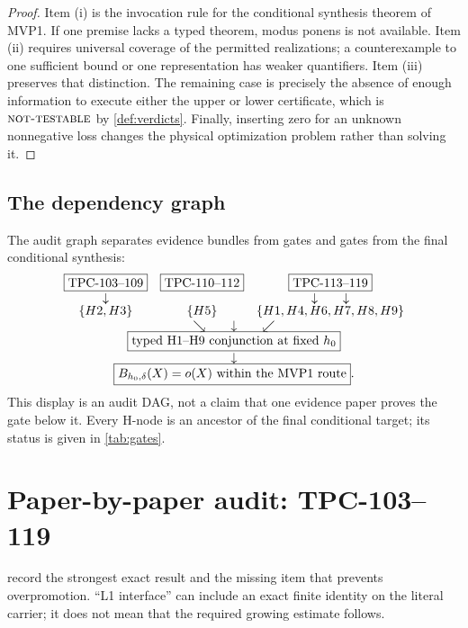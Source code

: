 \documentclass[11pt,a4paper]{article}
\theoremstyle{definition}
\theoremstyle{remark}
\newcommand{\NT}{\textnormal{\textsc{not-testable}}}
\begin{document}
\begin{proof}
Item (i) is the invocation rule for the conditional synthesis theorem
of MVP1.  If one premise lacks a typed theorem, modus ponens is not
available.  Item (ii) requires universal coverage of the permitted
realizations; a counterexample to one sufficient bound or one
representation has weaker quantifiers.  Item (iii) preserves that
distinction.  The remaining case is precisely the absence of enough
information to execute either the upper or lower certificate, which
is \(\NT\) by \cref{def:verdicts}.  Finally, inserting zero for an
unknown nonnegative loss changes the physical optimization problem
rather than solving it.
\end{proof}

\subsection{The dependency graph}

The audit graph separates evidence bundles from gates and gates from
the final conditional synthesis:
\[
\begin{array}{c@{\quad}c@{\quad}c}
\boxed{\text{TPC-103--109}}&
\boxed{\text{TPC-110--112}}&
\boxed{\text{TPC-113--119}}\\
\downarrow&&\downarrow\qquad\downarrow\\[-0.2em]
\{H2,H3\}&\{H5\}&\{H1,H4,H6,H7,H8,H9\}\\
\multicolumn{3}{c}{\searrow\qquad\downarrow\qquad\swarrow}\\[-0.2em]
\multicolumn{3}{c}{
\boxed{\text{typed H1--H9 conjunction at fixed }h_0}}\\
\multicolumn{3}{c}{\downarrow}\\[-0.2em]
\multicolumn{3}{c}{
\boxed{B_{h_0,\delta}(X)=o(X)\ \text{within the MVP1 route}}.}
\end{array}
\]
This display is an audit DAG, not a claim that one evidence paper
proves the gate below it.  Every H-node is an ancestor of the final
conditional target; its status is given in \cref{tab:gates}.

\section{Paper-by-paper audit: TPC-103--119}

 record the strongest exact result and
the missing item that prevents overpromotion.  ``L1 interface'' can
include an exact finite identity on the literal carrier; it does not
mean that the required growing estimate follows.
\end{document}
